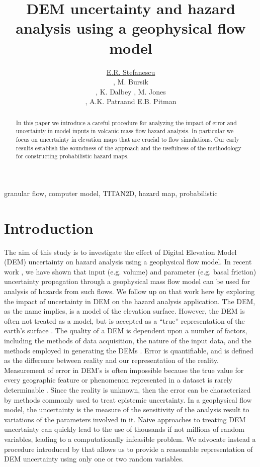 \documentclass[a4paper,fleqn]{article}
\title{DEM uncertainty and hazard analysis using a geophysical flow model}
\author{\underline{E.R. Stefanescu} \address[A1]{\it{Department of
Mechanical \& Aerospace Engineering, University at Buffalo, SUNY,
Buffalo,NY 14260 , (ers32@buffalo.edu, abani@buffalo.edu)}}, M.
Bursik\address[B1]{\it{Dept. of Geology, University at Buffalo, SUNY,
Buffalo,NY 14260 , (mib@buffalo.edu)}}, K. Dalbey \addressmark[A1],
M. Jones \address[C1] {\it {Center for Computational
Research,University at Buffalo, SUNY, Buffalo,NY 14260}}, A.K.
Patra\addressmark[A1] and E.B. Pitman\addressmark[A1] }
\begin{document}
\begin{abstract}
In this paper we introduce a careful procedure for analyzing the impact of 
error and uncertainty in model inputs in volcanic mass flow hazard analysis.
In particular we focus on uncertainty in elevation maps that are
crucial to flow simulations. Our early results establish the soundness
of the approach and the usefulness of the methodology for constructing
probabilistic hazard maps.
\end{abstract}
\begin{keyword}
  granular flow, computer model, TITAN2D, hazard map, probabilistic
\end{keyword}

\maketitle


\section{Introduction}

The aim of this study is to investigate the effect of Digital Elevation Model (DEM) uncertainty
on hazard analysis using a geophysical flow model.  In recent work
\citep{dalbeyjgr,dalbeythesis}, we have shown that input (e.g. volume)
and parameter (e.g. basal friction) uncertainty propagation through a
geophysical mass flow model can be used for analysis of hazards from
such flows. We follow up on that work here by exploring the impact of
uncertainty in DEM on the hazard analysis
application. The DEM, as the name implies, is a model of the elevation
surface. However, the DEM is often not treated as a model, but is
accepted as a ``true'' representation of the earth's surface
\citep{Suzanne_Wechsler}. The quality of a DEM is dependent upon a
number of factors, including the methods of data acquisition, the
nature of the input data, and the methods employed in generating the
DEMs \citep{Shearer_1990}.
Error is quantifiable, and is defined as the difference between
reality and our representation of the reality. Measurement of error
in DEM's is often impossible because the true value for every
geographic feature or phenomenon represented in a dataset is rarely
determinable \citep{Goodchild_1994, Hunter_1995}. Since the reality is
unknown, then the error can be characterized by methods commonly used
to treat epistemic uncertainty. In a geophysical flow model, the
uncertainty is the measure of the sensitivity of the analysis result
to variations of the parameters involved in it. Naive approaches to
treating DEM uncertainty can quickly lead to the use of thousands if
not millions of random variables, leading to a computationally
infeasible problem. We advocate instead a procedure introduced by
\citep{Goodchild_1994, Hunter_1995} that allows us to provide a
reasonable representation of DEM uncertainty using only one or two
random variables.
\end{document}
